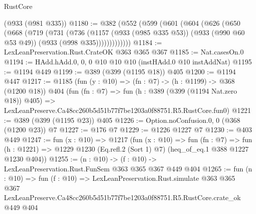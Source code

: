 \begin{lexlean}{RustCore}
\begin{coremodule}
    (@933 (@981 @335))
@1180 := @382
    (@552
      (@599
        (@601
          (@604
            (@626
              (@650
                (@668
                  (@719
                    (@731
                      (@736
                        (@1157
                          (@933 (@985 @335 @53))
                          (@933 (@990 @60 @53 @49))
                          (@933 (@998 @335)))))))))))))
@1184 := LexLeanPreservation.Rust.CrateOK @363 @365 @367
@1185 := Nat.casesOn.{0}
@1194 := HAdd.hAdd.{0, 0, 0} @10 @10 @10 (instHAdd.{0} @10 instAddNat)
@1195 := @1194 @449
@1199 := @389 (@399 (@1195 @18)) @405
@1200 := @1194 @447
@1217 := @1185
    (fun (y : @10) => (fn : @7) -> (h : @1199) -> @368 (@1200 @18))
    @404
    (fun (fn : @7) =>
    fun (h : @389 (@399 (@1194 Nat.zero @18)) @405) =>
    LexLeanPreserve.Ca48cc260b5d51b77f7be1203a0f88751.R5.RustCore.fun0)
@1221 := @389 (@399 (@1195 @23)) @405
@1226 := Option.noConfusion.{0, 0} (@368 (@1200 @23)) @7
@1227 := @176 @7
@1229 := @1226 @1227 @7
@1230 := @403 @449
@1247 := fun (x : @10) =>
  @1217
    (fun (x : @10) =>
    fun (fn : @7) =>
    fun (h : @1221) => @1229 @1230 (Eq.refl.{2} (Sort 1) @7) (heq_of_eq.{1} @388 @1227 @1230 @404))
@1255 := (n : @10) -> (f : @10) -> LexLeanPreservation.Rust.FunSem @363 @365 @367 @449 @404
@1265 := fun (n : @10) =>
  fun (f : @10) =>
  LexLeanPreservation.Rust.simulate
    @363
    @365
    @367
    LexLeanPreserve.Ca48cc260b5d51b77f7be1203a0f88751.R5.RustCore.crate_ok
    @449
    @404
\end{coremodule}
\end{lexlean}
